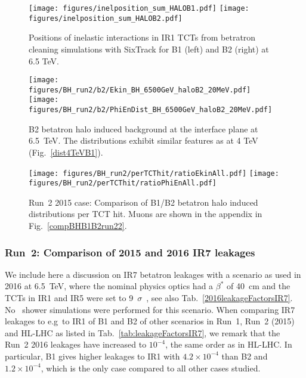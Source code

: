 \begin{figure}[!htb]
\begin{center}
\texttt{[image: figures/inelposition\_sum\_HALOB1.pdf]}
\texttt{[image: figures/inelposition\_sum\_HALOB2.pdf]}
\end{center}
 \caption{Positions of inelastic interactions in IR1 TCTs from betratron cleaning simulations with SixTrack for B1 (left) and B2 (right) at 6.5 TeV.
  \label{inel6.5}}
\end{figure}


\begin{figure}%
\centering
\texttt{[image: figures/BH\_run2/b2/Ekin\_BH\_6500GeV\_haloB2\_20MeV.pdf]}
\texttt{[image: figures/BH\_run2/b2/PhiEnDist\_BH\_6500GeV\_haloB2\_20MeV.pdf]}
 \caption{B2 betatron halo induced background at the interface plane at 6.5~TeV. The distributions exhibit similar features as at 4 TeV (Fig.~\ref{dist4TeVB1}).
  \label{dist6500GeVB2}}
\end{figure}


\begin{figure}%
\centering
  \texttt{[image: figures/BH\_run2/perTCThit/ratioEkinAll.pdf]}
  \texttt{[image: figures/BH\_run2/perTCThit/ratioPhiEnAll.pdf]}
 \caption{Run~2 2015 case: Comparison of B1/B2 betatron halo induced distributions per TCT hit. Muons are shown in the appendix in Fig.~\ref{compBHB1B2run22}.
  \label{compBHB1B2run2}}
\end{figure}

\subsubsection{Run~2: Comparison of 2015 and 2016 IR7 leakages}

We include here a discussion on IR7 betatron leakages with a scenario as used in 2016 at 6.5~TeV, where the nominal physics optics had a $\beta^*$ of 40~cm and the TCTs in IR1 and IR5 were set to 9~$\sigma$~\cite{bruceEvian2015}, see also Tab.~\ref{2016leakageFactorsIR7}. No \fluka~shower simulations were performed for this scenario. When comparing IR7 leakages to e.g~to IR1 of B1 and B2 of other scenarios in Run~1, Run~2 (2015) and HL-LHC as listed in Tab.~\ref{tab:leakageFactorsIR7}, we remark that the Run~2 2016 leakages have increased to $10^{-4}$, the same order as in HL-LHC. In particular, B1 gives higher leakages to IR1 with $4.2 \times 10^{-4}$ than B2 and $1.2 \times 10^{-4}$, which is the only case compared to all other cases studied. 



